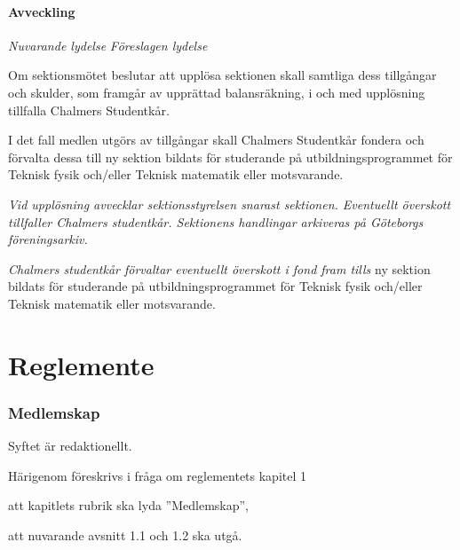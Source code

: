 \documentclass{article}
\newenvironment{lydelse}
    {\begin{paracol}{2}%
        \emph{Nuvarande lydelse}%
        \switchcolumn%
        \emph{Föreslagen lydelse}%
    \end{paracol}%
    \begin{enumerate}[label=\thesubsection.\arabic*]%
    \begin{paracol}{2}%
    }{\end{paracol}\end{enumerate}}
\begin{document}
\subsection{Avveckling}
\begin{lydelse}
  \setcounter{section}{15}
  \setcounter{subsection}{0}
  \setcounter{enumi}{1}
  \item Om sektionsmötet beslutar att upplösa sektionen skall samtliga dess tillgångar och skulder, som framgår av upprättad balansräkning, i och med upplösning tillfalla Chalmers Studentkår.
  \item I det fall medlen utgörs av tillgångar skall Chalmers Studentkår fondera och förvalta dessa till ny sektion bildats för studerande på utbildningsprogrammet för Teknisk fysik och/eller Teknisk matematik eller motsvarande.
  \switchcolumn
  \setcounter{subsection}{2}
  \item \emph{Vid upplösning avvecklar sektionsstyrelsen snarast sektionen.
      Eventuellt överskott tillfaller Chalmers studentkår.
      Sektionens handlingar arkiveras på Göteborgs föreningsarkiv.}
  \item \emph{Chalmers studentkår förvaltar eventuellt överskott i fond fram tills} ny sektion bildats för studerande på utbildningsprogrammet för Teknisk fysik och/eller Teknisk matematik eller motsvarande.
\end{lydelse}
\setcounter{section}{16}
\setcounter{subsection}{2}

\clearpage


\part{Reglemente}

\setcounter{section}{0}
\section{Medlemskap}
Syftet är redaktionellt.

Härigenom föreskrivs i fråga om reglementets kapitel 1
\begin{dels}
    \item att kapitlets rubrik ska lyda ''Medlemskap'',
    \item att nuvarande avsnitt 1.1 och 1.2 ska utgå.
\end{dels}
\end{document}
